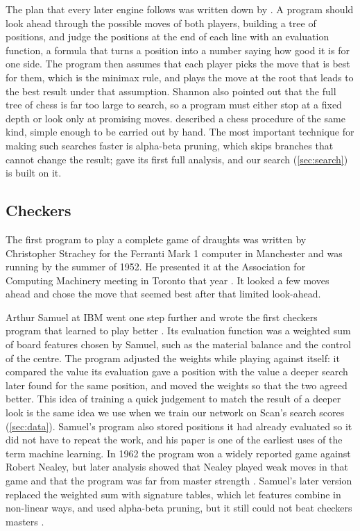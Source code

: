 The plan that every later engine follows was written down by
\textcite{shannon1950}. A program should look ahead through the possible moves
of both players, building a tree of positions, and judge the positions at the end
of each line with an evaluation function, a formula that turns a position into a
number saying how good it is for one side. The program then assumes that each
player picks the move that is best for them, which is the minimax rule, and plays
the move at the root that leads to the best result under that assumption. Shannon
also pointed out that the full tree of chess is far too large to search, so a
program must either stop at a fixed depth or look only at promising moves.
\textcite{turing1953} described a chess procedure of the same kind, simple enough
to be carried out by hand. The most important technique for making such searches
faster is alpha-beta pruning, which skips branches that cannot change the result;
\textcite{knuth1975} gave its first full analysis, and our search
(\cref{sec:search}) is built on it.

\subsection{Checkers}\label{sec:lit-checkers}

The first program to play a complete game of draughts was written by Christopher
Strachey for the Ferranti Mark 1 computer in Manchester and was running by the
summer of 1952. He presented it at the Association for Computing Machinery
meeting in Toronto that year \parencite{strachey1952}. It looked a few moves
ahead and chose the move that seemed best after that limited look-ahead.

Arthur Samuel at IBM went one step further and wrote the first checkers program
that learned to play better \parencite{samuel1959}. Its evaluation function was a
weighted sum of board features chosen by Samuel, such as the material balance
and the control of the centre. The program adjusted the weights while playing
against itself: it compared the value its evaluation gave a position with the
value a deeper search later found for the same position, and moved the weights so
that the two agreed better. This idea of training a quick judgement to match the
result of a deeper look is the same idea we use when we train our network on
Scan's search scores (\cref{sec:data}). Samuel's program also stored positions it
had already evaluated so it did not have to repeat the work, and his paper is one
of the earliest uses of the term machine learning. In 1962 the program won a
widely reported game against Robert Nealey, but later analysis showed that Nealey
played weak moves in that game and that the program was far from master
strength \parencite{schaeffer1997}. Samuel's later version replaced the weighted
sum with signature tables, which let features combine in non-linear ways, and
used alpha-beta pruning, but it still could not beat checkers masters
\parencite{samuel1967}.

